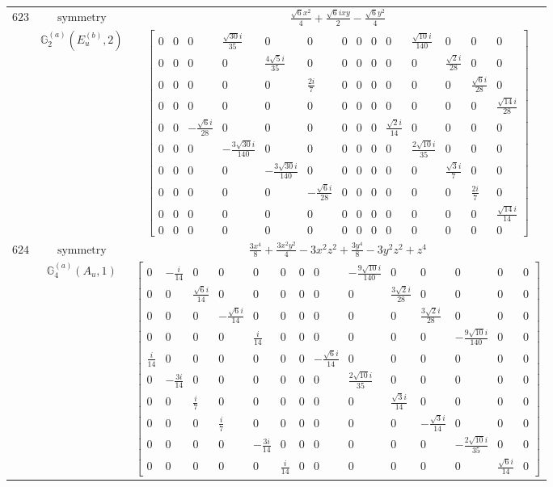 \documentclass[fleqn,8pt,landscape]{jsarticle}
\begin{document}
\begin{longtable}{ccc}
$ 623 $ & $ \text{symmetry} $ & $ \frac{\sqrt{6} x^{2}}{4} + \frac{\sqrt{6} i x y}{2} - \frac{\sqrt{6} y^{2}}{4} $ \\
$  $ & $ \mathbb{G}_{2}^{(a)}(E_{u}^{(b)},2) $ & $ \begin{bmatrix} 0 & 0 & 0 & \frac{\sqrt{30} i}{35} & 0 & 0 & 0 & 0 & 0 & 0 & \frac{\sqrt{10} i}{140} & 0 & 0 & 0 \\ 0 & 0 & 0 & 0 & \frac{4 \sqrt{5} i}{35} & 0 & 0 & 0 & 0 & 0 & 0 & \frac{\sqrt{2} i}{28} & 0 & 0 \\ 0 & 0 & 0 & 0 & 0 & \frac{2 i}{7} & 0 & 0 & 0 & 0 & 0 & 0 & \frac{\sqrt{6} i}{28} & 0 \\ 0 & 0 & 0 & 0 & 0 & 0 & 0 & 0 & 0 & 0 & 0 & 0 & 0 & \frac{\sqrt{14} i}{28} \\ 0 & 0 & - \frac{\sqrt{6} i}{28} & 0 & 0 & 0 & 0 & 0 & 0 & \frac{\sqrt{2} i}{14} & 0 & 0 & 0 & 0 \\ 0 & 0 & 0 & - \frac{3 \sqrt{30} i}{140} & 0 & 0 & 0 & 0 & 0 & 0 & \frac{2 \sqrt{10} i}{35} & 0 & 0 & 0 \\ 0 & 0 & 0 & 0 & - \frac{3 \sqrt{30} i}{140} & 0 & 0 & 0 & 0 & 0 & 0 & \frac{\sqrt{3} i}{7} & 0 & 0 \\ 0 & 0 & 0 & 0 & 0 & - \frac{\sqrt{6} i}{28} & 0 & 0 & 0 & 0 & 0 & 0 & \frac{2 i}{7} & 0 \\ 0 & 0 & 0 & 0 & 0 & 0 & 0 & 0 & 0 & 0 & 0 & 0 & 0 & \frac{\sqrt{14} i}{14} \\ 0 & 0 & 0 & 0 & 0 & 0 & 0 & 0 & 0 & 0 & 0 & 0 & 0 & 0 \end{bmatrix} $ \\ \hline
$ 624 $ & $ \text{symmetry} $ & $ \frac{3 x^{4}}{8} + \frac{3 x^{2} y^{2}}{4} - 3 x^{2} z^{2} + \frac{3 y^{4}}{8} - 3 y^{2} z^{2} + z^{4} $ \\
$  $ & $ \mathbb{G}_{4}^{(a)}(A_{u},1) $ & $ \begin{bmatrix} 0 & - \frac{i}{14} & 0 & 0 & 0 & 0 & 0 & 0 & - \frac{9 \sqrt{10} i}{140} & 0 & 0 & 0 & 0 & 0 \\ 0 & 0 & \frac{\sqrt{6} i}{14} & 0 & 0 & 0 & 0 & 0 & 0 & \frac{3 \sqrt{2} i}{28} & 0 & 0 & 0 & 0 \\ 0 & 0 & 0 & - \frac{\sqrt{6} i}{14} & 0 & 0 & 0 & 0 & 0 & 0 & \frac{3 \sqrt{2} i}{28} & 0 & 0 & 0 \\ 0 & 0 & 0 & 0 & \frac{i}{14} & 0 & 0 & 0 & 0 & 0 & 0 & - \frac{9 \sqrt{10} i}{140} & 0 & 0 \\ \frac{i}{14} & 0 & 0 & 0 & 0 & 0 & 0 & - \frac{\sqrt{6} i}{14} & 0 & 0 & 0 & 0 & 0 & 0 \\ 0 & - \frac{3 i}{14} & 0 & 0 & 0 & 0 & 0 & 0 & \frac{2 \sqrt{10} i}{35} & 0 & 0 & 0 & 0 & 0 \\ 0 & 0 & \frac{i}{7} & 0 & 0 & 0 & 0 & 0 & 0 & \frac{\sqrt{3} i}{14} & 0 & 0 & 0 & 0 \\ 0 & 0 & 0 & \frac{i}{7} & 0 & 0 & 0 & 0 & 0 & 0 & - \frac{\sqrt{3} i}{14} & 0 & 0 & 0 \\ 0 & 0 & 0 & 0 & - \frac{3 i}{14} & 0 & 0 & 0 & 0 & 0 & 0 & - \frac{2 \sqrt{10} i}{35} & 0 & 0 \\ 0 & 0 & 0 & 0 & 0 & \frac{i}{14} & 0 & 0 & 0 & 0 & 0 & 0 & \frac{\sqrt{6} i}{14} & 0 \end{bmatrix} $ \\ \hline

\end{longtable}
\end{document}
